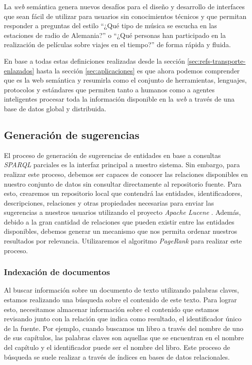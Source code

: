 La \textit{web} semántica genera nuevos desafíos para el diseño y desarrollo de interfaces que sean fácil de utilizar para usuarios sin conocimientos técnicos y que permitan responder a preguntas del estilo ``¿Qué tipo de música se escucha en las estaciones de radio de Alemania?'' o ``¿Qué personas han participado en la realización de películas sobre viajes en el tiempo?'' de forma rápida y fluida.

En base a todas estas definiciones realizadas desde la sección \ref{sec:refs-transporte-enlazados} hasta la sección \ref{sec:aplicaciones} es que ahora podemos comprender que es la web semántica y resumirla como el conjunto de herramientas, lenguajes, protocolos y estándares que permiten tanto a humanos como a agentes inteligentes procesar toda la información disponible en la \textit{web} a través de una base de datos global y distribuida.

\subsection{Generación de sugerencias}

El proceso de generación de sugerencias de entidades en base a consultas \textit{SPARQL} parciales es la interfaz principal a nuestro sistema. Sin embargo, para realizar este proceso, debemos ser capaces de conocer las relaciones disponibles en nuestro conjunto de datos sin consultar directamente al repositorio fuente. Para esto, crearemos un repositorio local que contendrá las entidades, identificadores, descripciones, relaciones y otras propiedades necesarias para enviar las sugerencias a nuestros usuarios utilizando el proyecto \textit{Apache Lucene} \cite{apache2012welcome}. Además, debido a la gran cantidad de relaciones que pueden existir entre las entidades disponibles, debemos generar un mecanismo que nos permita ordenar nuestros resultados por relevancia. Utilizaremos el algoritmo \textit{PageRank} \cite{page1999pagerank} para realizar este proceso.

\subsubsection{Indexación de documentos}
\label{sec:index-types}

Al buscar información sobre un documento de texto utilizando palabras claves, estamos realizando una búsqueda sobre el contenido de este texto. Para lograr esto, necesitamos almacenar información sobre el contenido que estamos revisando junto con la relación que indica como resultado, el identificador único de la fuente. Por ejemplo, cuando buscamos un libro a través del nombre de uno de sus capítulos, las palabras claves son aquellas que se encuentran en el nombre del capítulo y el identificador puede ser el nombre del libro. Este proceso de búsqueda se suele realizar a través de índices en bases de datos relacionales.

